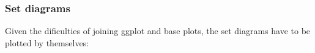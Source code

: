 \begin{Shaded}
\begin{Highlighting}[]
\NormalTok{(}
\NormalTok{  ,}
\NormalTok{  ,} \OperatorTok{*}
\NormalTok{  ,} \OperatorTok{*}
\NormalTok{  ,}
\NormalTok{  ,}
\NormalTok{)}
\end{Highlighting}
\end{Shaded}

\hypertarget{set-diagrams}{%
\subsubsection{Set diagrams}\label{set-diagrams}}

Given the dificulties of joining ggplot and base plots, the set diagrams
have to be plotted by themselves:

